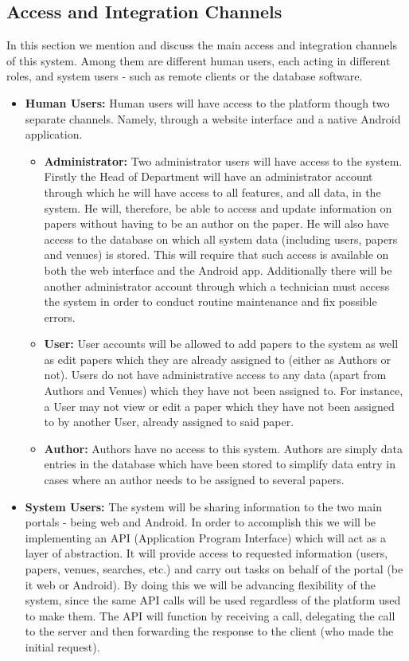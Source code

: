 \documentclass[a4paper,12pt]{article}
\begin{document}
\subsection{Access and Integration Channels}
In this section we mention and discuss the main access and integration channels of this system. Among them are different human users, each acting in different roles, and system users - such as remote clients or the database software.
\begin{itemize}
\item \textbf{Human Users:}
Human users will have access to the platform though two separate channels. Namely, through a website interface and a native Android application. 
\begin{itemize}
\item \textbf{Administrator:} Two administrator users will have access to the system. Firstly the Head of Department will have an administrator account through which he will have access to all features, and all data, in the system. He will, therefore, be able to access and update information on papers without having to be an author on the paper. He will also have access to the database on which all system data (including users, papers and venues) is stored. This will require that such access is available on both the web interface and the Android app. Additionally there will be another administrator account through which a technician must access the system in order to conduct routine maintenance and fix possible errors.
\item \textbf{User:} User accounts will be allowed to add papers to the system as well as edit papers which they are already assigned to (either as Authors or not). Users do not have administrative access to any data (apart from Authors and Venues) which they have not been assigned to. For instance, a User may not view or edit a paper which they have not been assigned to by another User, already assigned to said paper.
\item \textbf{Author:} Authors have no access to this system. Authors are simply data entries in the database which have been stored to simplify data entry in cases where an author needs to be assigned to several papers.
\end{itemize}
\item \textbf{System Users:}
The system will be sharing information to the two main portals - being web and Android. In order to accomplish this we will be implementing an API (Application Program Interface) which will act as a layer of abstraction. It will provide access to requested information (users, papers, venues, searches, etc.) and carry out tasks on behalf of the portal (be it web or Android). By doing this we will be advancing flexibility of the system, since the same API calls will be used regardless of the platform used to make them. The API will function by receiving a call, delegating the call to the server and then forwarding the response to the client (who made the initial request).


\end{itemize}
\end{document}
